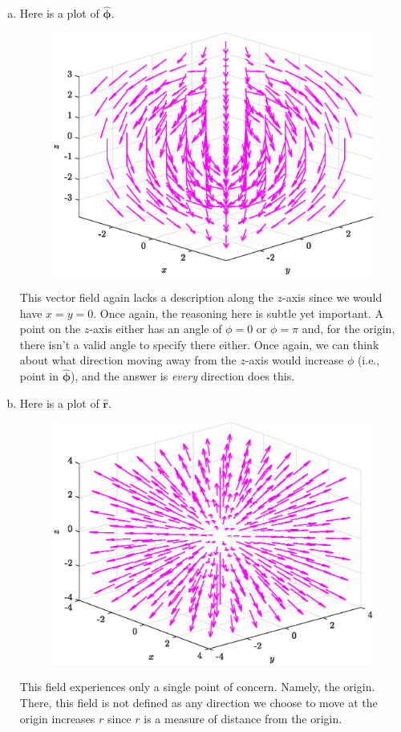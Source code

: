 \documentclass[12pt]{article} %
\newcommand{\rhat}{\boldsymbol{\hat{r}}}
\newcommand{\phihat}{\boldsymbol{\hat{\phi}}}
\begin{document}
\begin{solution}
\begin{enumerate}[(a)]
    \item Here is a plot of $\phihat$.
    \begin{figure}[H]
        \centering
        \includegraphics[width=.6\textwidth]{figures/phi_hat}
    \end{figure}
    This vector field again lacks a description along the $z$-axis since we would have $x=y=0$. Once again, the reasoning here is subtle yet important. A point on the $z$-axis either has an angle of $\phi = 0$ or $\phi = \pi$ and, for the origin, there isn't a valid angle to specify there either. Once again, we can think about what direction moving away from the $z$-axis would increase $\phi$ (i.e., point in $\phihat$), and the answer is \emph{every} direction does this. 

    \item Here is a plot of $\rhat$.
    \begin{figure}[H]
        \centering
        \includegraphics[width=.6\textwidth]{figures/r_hat}
    \end{figure}
    This field experiences only a single point of concern. Namely, the origin. There, this field is not defined as any direction we choose to move at the origin increases $r$ since $r$ is a measure of distance from the origin. 
\end{enumerate}
\end{solution}
\vspace*{1cm}
\end{document}
